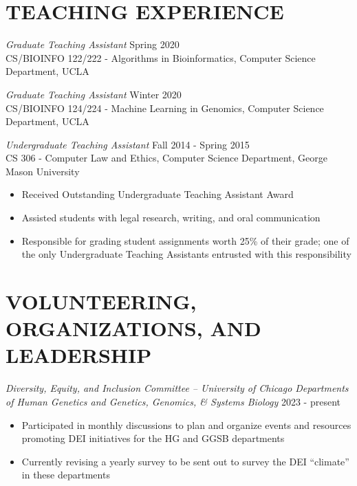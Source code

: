 \documentclass[margin, 10pt]{res} %
\begin{document}
\begin{resume}
 
\section{TEACHING EXPERIENCE}

{\sl Graduate Teaching Assistant} \hfill Spring 2020 \\
CS/BIOINFO 122/222 - Algorithms in Bioinformatics, Computer Science Department, UCLA

{\sl Graduate Teaching Assistant} \hfill Winter 2020 \\
CS/BIOINFO 124/224 - Machine Learning in Genomics, Computer Science Department, UCLA

{\sl Undergraduate Teaching Assistant} \hfill Fall 2014 - Spring 2015 \\
CS 306 - Computer Law and Ethics, Computer Science Department, George Mason University
\begin{itemize} \itemsep -2pt %
\item Received Outstanding Undergraduate Teaching Assistant Award 
\item Assisted students with legal research, writing, and oral communication
\item Responsible for grading student assignments worth 25\% of their grade; one of the only Undergraduate Teaching Assistants entrusted with this responsibility
\end{itemize} 




\section{VOLUNTEERING, ORGANIZATIONS, AND LEADERSHIP}
{\sl Diversity, Equity, and Inclusion Committee -- University of Chicago Departments of Human Genetics and Genetics, Genomics, \& Systems Biology} \hfill 2023 - present
\begin{itemize} \itemsep -2pt %
\item Participated in monthly discussions to plan and organize events and resources promoting DEI initiatives for the HG and GGSB departments
\item Currently revising a yearly survey to be sent out to survey the DEI ``climate'' in these departments
\end{itemize}


\end{resume}
\end{document}
